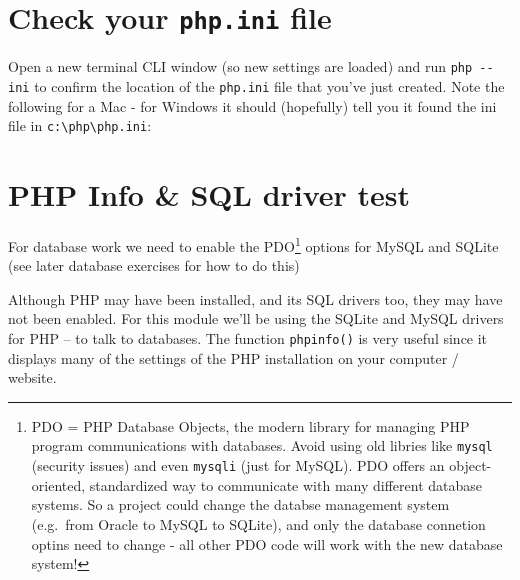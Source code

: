 \documentclass[a4paperpaper,openright]{book}
\newenvironment{Shaded}{}{}
\newcommand{\ExtensionTok}[1]{#1}
\newcommand{\NormalTok}[1]{#1}
\begin{document}
\hypertarget{check-your-php.ini-file}{%
\section{\texorpdfstring{Check your \texttt{php.ini}
file}{Check your php.ini file}}\label{check-your-php.ini-file}}

Open a new terminal CLI window (so new settings are loaded) and run
\texttt{php\ -\/-ini} to confirm the location of the \texttt{php.ini}
file that you've just created. Note the following for a Mac - for
Windows it should (hopefully) tell you it found the ini file in
\texttt{c:\textbackslash{}php\textbackslash{}php.ini}:

\begin{Shaded}
\end{Shaded}

\hypertarget{php-info-sql-driver-test}{%
\section{PHP Info \& SQL driver test}\label{php-info-sql-driver-test}}

For database work we need to enable the PDO\footnote{PDO = PHP Database
  Objects, the modern library for managing PHP program communications
  with databases. Avoid using old libries like \texttt{mysql} (security
  issues) and even \texttt{mysqli} (just for MySQL). PDO offers an
  object-oriented, standardized way to communicate with many different
  database systems. So a project could change the databse management
  system (e.g.~from Oracle to MySQL to SQLite), and only the database
  connetion optins need to change - all other PDO code will work with
  the new database system!} options for MySQL and SQLite (see later
database exercises for how to do this)

Although PHP may have been installed, and its SQL drivers too, they may
have not been enabled. For this module we'll be using the SQLite and
MySQL drivers for PHP -- to talk to databases. The function
\texttt{phpinfo()} is very useful since it displays many of the settings
of the PHP installation on your computer / website.
\end{document}
